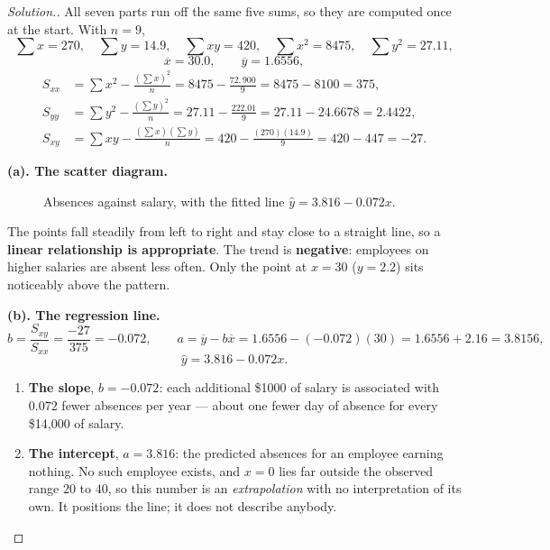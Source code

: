 \documentclass[11pt,a4paper]{article}
\theoremstyle{definition}
\newenvironment{solution}
  {\renewcommand{\qedsymbol}{}\begin{proof}[\textit{Solution}.]}
  {\end{proof}}
\begin{document}
\begin{solution}
All seven parts run off the same five sums, so they are computed once at the start. With
$n=9$,
\[\sum x=270,\quad \sum y=14.9,\quad \sum xy=420,\quad \sum x^2=8475,\quad \sum y^2=27.11,\]
\[\overline{x}=30.0,\qquad \overline{y}=1.6556,\]
\begin{align*}
S_{xx}&=\sum x^2-\frac{(\sum x)^2}{n}=8475-\frac{72{,}900}{9}=8475-8100=375,\\
S_{yy}&=\sum y^2-\frac{(\sum y)^2}{n}=27.11-\frac{222.01}{9}=27.11-24.6678=2.4422,\\
S_{xy}&=\sum xy-\frac{(\sum x)(\sum y)}{n}=420-\frac{(270)(14.9)}{9}=420-447=-27.
\end{align*}

\textbf{(a). The scatter diagram.}


\begin{figure}[H]
\centering
{}
\caption{Absences against salary, with the fitted line $\hat{y}=3.816-0.072x$.}
\end{figure}

The points fall steadily from left to right and stay close to a straight line, so a
\textbf{linear relationship is appropriate}. The trend is \textbf{negative}: employees on
higher salaries are absent less often. Only the point at $x=30$ ($y=2.2$) sits noticeably
above the pattern.

\textbf{(b). The regression line.}
\[b=\frac{S_{xy}}{S_{xx}}=\frac{-27}{375}=-0.072,\qquad
a=\overline{y}-b\overline{x}=1.6556-(-0.072)(30)=1.6556+2.16=3.8156,\]
\[\hat{y}=3.816-0.072x.\]
\begin{enumerate}
\item[$\bullet$] \textbf{The slope}, $b=-0.072$: each additional \$1000 of salary is
associated with $0.072$ fewer absences per year --- about one fewer day of absence for every
\$14,000 of salary.
\item[$\bullet$] \textbf{The intercept}, $a=3.816$: the predicted absences for an employee
earning nothing. No such employee exists, and $x=0$ lies far outside the observed range
$20$ to $40$, so this number is an \emph{extrapolation} with no interpretation of its own.
It positions the line; it does not describe anybody.
\end{enumerate}


\end{solution}
\end{document}
